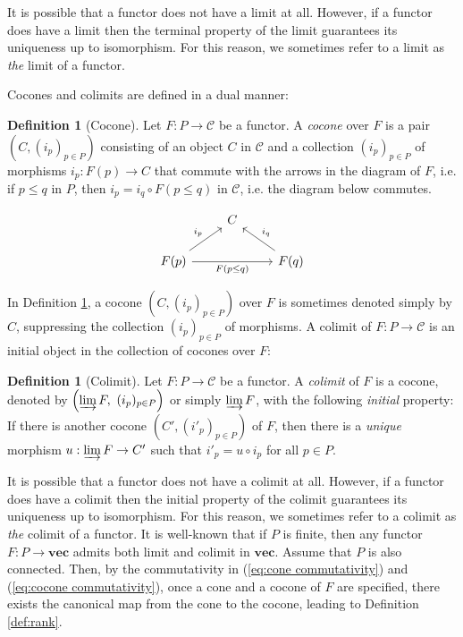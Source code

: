 \documentclass[11pt]{article}
\theoremstyle{definition}
\newtheorem{definition}[theorem]{Definition}
\newcommand{\Pb}{P}
\newcommand{\vect}{\mathbf{vec}}
\newcommand{\C}{\mathcal{C}}
\begin{document}
It is possible that a functor does not have a limit at all. However, if a functor does have a limit then the terminal property of the limit guarantees its uniqueness up to isomorphism. For this reason, we  sometimes refer to a limit as \emph{the} limit of a functor. 


Cocones and colimits are defined in a dual manner:
\begin{definition}[Cocone]\label{def:cocone} Let $F:\Pb\rightarrow \C$ be a functor. A \emph{cocone} over $F$ is a pair $\left(C,(i_p)_{p\in \Pb}\right)$ consisting of an object $C$ in $\C$ and a collection $(i_p)_{p\in \Pb}$ of morphisms $i_p:F(p)\rightarrow C$ that commute with the arrows in the diagram of $F$, i.e. if $p\leq q$ in $\Pb$, then $i_p= i_q\circ F(p\leq q)$ in $\C$, i.e. the diagram below commutes.
\end{definition}
\begin{equation}\label{eq:cocone commutativity}
    \begin{tikzcd}
&C\\
F(p)\arrow{ru}{i_p}\arrow{rr}[swap]{F(p\leq q)}&&F(q)\arrow{lu}[swap]{i_q}
\end{tikzcd}
\end{equation}

In Definition \ref{def:cocone}, a cocone $\left(C,(i_p)_{p\in \Pb}\right)$ over $F$ is sometimes denoted simply by $C$, suppressing the collection $(i_p)_{p\in \Pb}$ of morphisms. A colimit of $F:\Pb\rightarrow \C$ is an initial object in the collection of cocones over $F$:

\begin{definition}[Colimit]\label{def:colimit}Let $F:\Pb\rightarrow \C$ be a functor. A \emph{colimit} of $F$ is a cocone, denoted by $\left(\varinjlim F,\ (i_p)_{p\in \Pb}\right)$ or simply $\varinjlim F$, with the following \emph{initial} property: If there is another cocone $\left(C', (i'_p)_{p\in \Pb}\right)$ of $F$, then there is a \emph{unique} morphism $u:\varinjlim F\rightarrow C'$  such that $i'_p=u\circ i_p$ for all $p\in \Pb$.
\end{definition}

It is possible that a functor does not have a colimit at all. However, if a functor does have a colimit then the initial property of the colimit guarantees its uniqueness up to isomorphism. For this reason, we sometimes refer to a colimit as \emph{the} colimit of a functor.  
It is well-known that if $P$ is finite, then any functor $F:\Pb\rightarrow \vect$ admits both limit and colimit in $\vect$. Assume that $\Pb$ is also connected. Then, by the commutativity in (\ref{eq:cone commutativity}) and (\ref{eq:cocone commutativity}), once a cone and a cocone of $F$ are specified, there exists the canonical map from the cone to the cocone, leading to Definition \ref{def:rank}. 
\end{document}
